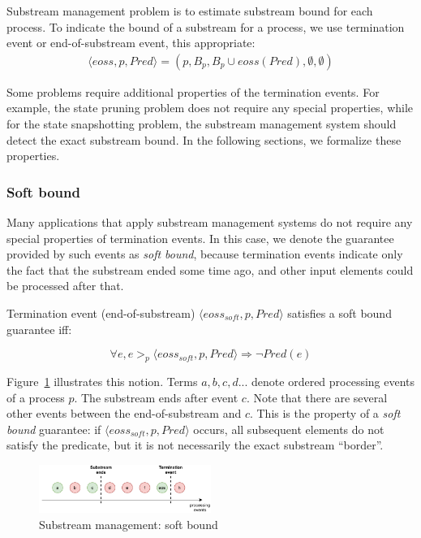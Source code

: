 \begin{definition}
Substream management problem is to estimate substream bound for each process. To indicate the bound of a substream for a process, we use termination event or end-of-substream event, this appropriate:
\begin{multline}
  \langle eoss, p, Pred \rangle = (p, B_p, B_p\cup eoss(Pred), \emptyset, \emptyset)  
\end{multline}
\end{definition}

Some problems require additional properties of the termination events. For example, the state pruning problem does not require any special properties, while for the state snapshotting problem, the substream management system should detect the exact substream bound. In the following sections, we formalize these properties. 

\subsubsection{Soft bound}

Many applications that apply substream management systems do not require any special properties of termination events. In this case, we denote the guarantee provided by such events as {\em soft bound}, because termination events indicate only the fact that the substream ended some time ago, and other input elements could be processed after that.

\begin{definition}
Termination event (end-of-substream) $\langle eoss_{soft}, p, Pred\rangle$ satisfies a soft bound guarantee iff:

\begin{equation}
\forall e, e >_p \langle eoss_{soft}, p, Pred\rangle \Rightarrow \neg Pred(e)
\end{equation}
\end{definition}

Figure~\ref{general_guarantees} illustrates this notion. Terms $a,b,c,d...$ denote ordered processing events of a process $p$. The substream ends after event $c$. Note that there are several other events between the end-of-substream and $c$. This is the property of a {\em soft bound} guarantee: if $\langle eoss_{soft}, p, Pred\rangle$ occurs, all subsequent elements do not satisfy the predicate, but it is not necessarily the exact substream ``border''.

\begin{figure}[t]
  \centering
  \includegraphics[width=0.50\textwidth]{pics/general-guarantee.pdf}
  \caption{Substream management: soft bound}
  \label{general_guarantees}
\end{figure}

